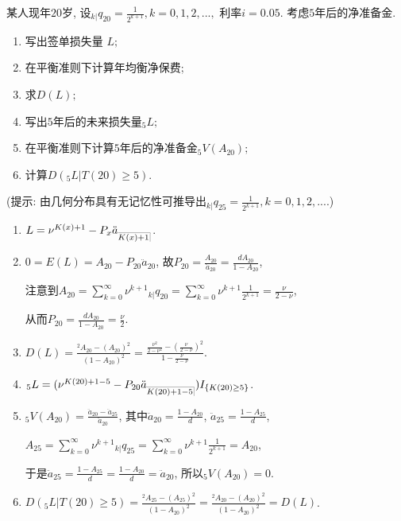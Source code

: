 \documentclass[lang=cn,10pt]{elegantbook}
\makeatletter
\DeclareRobustCommand{\annu}[1]{_{%
    \def\arraystretch{0}%
    \setlength\arraycolsep{1pt}%
    \setlength\arrayrulewidth{.2pt}%
    \begin{array}[b]{@{}c|}\hline
        \\[\arraycolsep]%
        \scriptstyle #1%
    \end{array}%
}}
\makeatother
\begin{document}
\begin{example}\label{l5.2}某人现年$20$岁, 设${}_{k|}q_{20}=\frac{1}{2^{k+1}},k=0,1,2,...,$ 利率$i=0.05.$ 考虑$5$年后的净准备金.
    \begin{enumerate}[(1)]
        \item 写出签单损失量 $L;$
        \item 在平衡准则下计算年均衡净保费;
        \item 求$D(L);$
        \item 写出$5$年后的未来损失量$_{5}L;$
        \item 在平衡准则下计算$5$年后的净准备金${}_{5}V( A_{20});$
        \item 计算$D({}_{5}L|T(20)\geq 5).$
    \end{enumerate}
    (提示: 由几何分布具有无记忆性可推导出${}_{k|}q_{25}=\frac{1}{2^{k+1}},k=0,1,2,....$)
\end{example}
\begin{solution}
    \begin{enumerate}[(1)]
        \item $L = \nu^{K(x)+1} - P_x\ddot{a}_{\annu{K(x)+1}}$.
        \item $0=E(L)=A_{20}-P_{20}\ddot{a}_{20}$, 故$P_{20}=\frac{A_{20}}{\ddot{a}_{20}} = \frac{dA_{20}}{1-A_{20}}$,

              注意到$A_{20}=\sum_{k=0}^{\infty}\nu^{k+1}{}_{k|}q_{20} = \sum_{k=0}^{\infty}\nu^{k+1}\frac{1}{2^{k+1}} = \frac{\nu}{2-\nu}$,

              从而$P_{20}=\frac{dA_{20}}{1-A_{20}}=\frac{\nu}{2}.$
        \item $D(L)=\frac{^2A_{20}-(A_{20})^2}{(1-A_{20})^2}=\frac{\frac{\nu^{2}}{2-\nu^{2}}-\left(\frac{\nu}{2-\nu}\right)^{2}}{1-\frac{\nu}{2-\nu}}$.
        \item ${}_{5}L= (\nu^{K(20)+1-5}-P_{20}\ddot{a}_{\annu{K(20)+1-5}} )I_{\{K(20)\geq 5\}}$.
        \item ${}_{5}V(A_{20})=\frac{\ddot{a}_{20}-\ddot{a}_{25}}{\ddot{a}_{20}}$, 其中$\ddot{a}_{20}=\frac{1-A_{20}}{d}$, $\ddot{a}_{25}=\frac{1-A_{25}}{d}$,

              $A_{25}=\sum_{k=0}^{\infty}\nu^{k+1}{}_{k|}q_{25} = \sum_{k=0}^{\infty}\nu^{k+1}\frac{1}{2^{k+1}} = A_{20}$,

              于是$\ddot{a}_{25}=\frac{1-A_{25}}{d} = \frac{1-A_{20}}{d} = \ddot{a}_{20}$, 所以${}_{5}V(A_{20})=0$.
        \item $D({}_{5}L|T(20)\geq 5)=\frac{^2A_{25}-(A_{25})^2}{(1-A_{20})^2} = \frac{^2A_{20}-(A_{20})^2}{(1-A_{20})^2} = D(L)$.
    \end{enumerate}
\end{solution}
\end{document}
